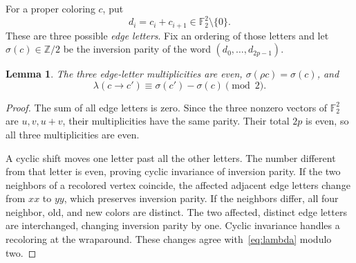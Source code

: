 \documentclass[11pt]{amsart}
\newtheorem{lemma}[theorem]{Lemma}
\theoremstyle{remark}
\numberwithin{equation}{section}
\newcommand{\Z}{\mathbb Z}
\newcommand{\F}{\mathbb F}
\begin{document}
For a proper coloring $c$, put
\[
 d_i=c_i+c_{i+1}\in\F_2^2\setminus\{0\}.
\]
These are three possible \emph{edge letters}. Fix an ordering of those letters and let $\sigma(c)\in\Z/2$ be the inversion parity of the word $(d_0,\ldots,d_{2p-1})$.

\begin{lemma}\label{lem:parity}
The three edge-letter multiplicities are even, $\sigma(\rho c)=\sigma(c)$, and
\begin{equation}\label{eq:parity}
 \lambda(c\to c')\equiv\sigma(c')-\sigma(c)\pmod2.
\end{equation}
\end{lemma}
\begin{proof}
The sum of all edge letters is zero. Since the three nonzero vectors of $\F_2^2$ are $u,v,u+v$, their multiplicities have the same parity. Their total $2p$ is even, so all three multiplicities are even.

A cyclic shift moves one letter past all the other letters. The number different from that letter is even, proving cyclic invariance of inversion parity. If the two neighbors of a recolored vertex coincide, the affected adjacent edge letters change from $xx$ to $yy$, which preserves inversion parity. If the neighbors differ, all four neighbor, old, and new colors are distinct. The two affected, distinct edge letters are interchanged, changing inversion parity by one. Cyclic invariance handles a recoloring at the wraparound. These changes agree with~\eqref{eq:lambda} modulo two.
\end{proof}
\end{document}
